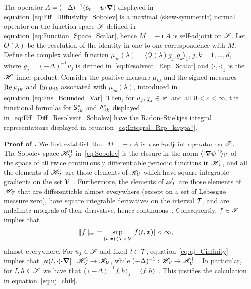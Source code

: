 \documentclass[amsa]{ipart}
\begin{document}
%
\begin{theorem}\label{thm:Integral_Reps}
  The operator $A=(-\Delta)^{-1}(\partial_t-\boldsymbol{u}\mbox{\boldmath${\cdot}$}\mbox{\boldmath${\nabla}$})$ displayed in
  equation~\eqref{eq:Eff_Diffusivity_Sobolev} is a maximal
  (skew-symmetric) normal operator on the function space $\mathscr{F}$ defined
  in equation~\eqref{eq:Function_Space_Scalar}, hence $M=-\imath A$ is 
  self-adjoint on $\mathscr{F}$. Let $Q(\lambda)$ be the resolution of the
  identity in one-to-one correspondence with $M$. Define the complex
  valued   function $\mu_{jk}(\lambda)=\langle Q(\lambda)g_j,g_k\rangle_1$, $j,k=1,\ldots,d$, where
  $g_j=(-\Delta)^{-1}u_j$ is defined in~\eqref{eq:Resolvent_Rep_Scalar} and 
  $\langle\cdot,\cdot\rangle_1$ is the $\mathscr{H}$--inner-product. Consider the positive measure
  $\mu_{kk}$ and the signed measures $\mbox{Re}\,\mu_{jk}$ and $\mbox{Im}\,\mu_{jk}$
  associated with $\mu_{jk}(\lambda)$, introduced in
  equation~\eqref{eq:Fns_Bounded_Var}.  Then, for $u_j,\chi_j\in\mathscr{F}$
  and all $0<\varepsilon<\infty$,
  the functional formulas for $\mathsf{S}^*_{jk}$ and $\mathsf{A}^*_{jk}$ displayed
  in~\eqref{eq:Eff_Diff_Resolvent_Sobolev} have the 
  Radon--Stieltjes integral representations displayed in
  equation~\eqref{eq:Integral_Rep_kappa*}.   
% 
\end{theorem}
%

\textbf{Proof of .}\hspace{1ex}
%
We first establish that $M=-\imath A$ is a self-adjoint operator on
$\mathscr{F}$. The Sobolev space $\mathscr{H}^1_{\mathcal{V}}$ in~\eqref{eq:Sobolev} is the
closure in the norm $\langle|\mbox{\boldmath${\nabla}$}\psi|^2\rangle_{\mathcal{V}}$ of the space of all twice
continuously differentiable periodic functions in $\mathscr{H}_{\mathcal{V}}$, and all
the elements of $\mathscr{H}^1_{\mathcal{V}}$ are those elements of $\mathscr{H}_{\mathcal{V}}$ which
have square integrable gradients on the set
$\mathcal{V}$~\cite{Bhattacharya:AAP:1999:951}. Furthermore, the elements of
$\tilde{\mathscr{A}}_{\mathcal{T}}$ are those elements of $\mathscr{H}_{\mathcal{T}}$ that are
differentiable almost everywhere (except on a set of Lebesgue measure
zero), have square integrable derivatives on the interval
$\mathcal{T}$, and are indefinite integrals of their
derivative, hence continuous~\cite{Royden:1988:RA}. Consequently,
$f\in\mathscr{F}$ implies that~\cite{Stone:64,Royden:1988:RA}  
%
\begin{align}\label{eq:uj_Cinfinity}
  \|f\|_\infty=\sup_{(t,\vecx)\in\Tc\times\Vc}|f(t,\vecx)|<\infty,
\end{align}
%
almost everywhere. For $u_j\in\mathscr{F}$ and fixed $t\in\mathcal{T}$,
equation~\eqref{eq:uj_Cinfinity} implies that 
$[\boldsymbol{u}(t,\cdot)\mbox{\boldmath${\cdot}$}\mbox{\boldmath${\nabla}$}]:\mathscr{H}^1_{\mathcal{V}}\to\mathscr{H}_{\mathcal{V}}$, while
$(-\Delta)^{-1}:\mathscr{H}_{\mathcal{V}}\to\mathscr{H}^1_{\mathcal{V}}$~\cite{Bhattacharya:AAP:1999:951}. In
particular, for $f,h\in\mathscr{F}$ we have that
$\langle(-\Delta)^{-1}f,h\rangle_1=\langle f,h\rangle$~\cite{Bhattacharya:AAP:1999:951}. This 
justifies the calculation in equation~\eqref{eq:uj_chik}.  
\end{document}
